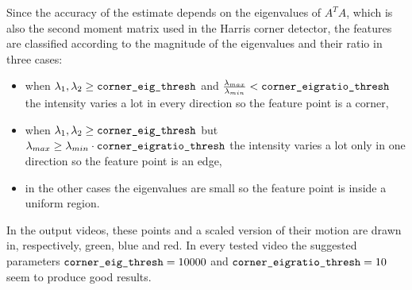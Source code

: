 \documentclass[a4paper,oneside]{article}
\newcommand{\textinlinecode}[1]{\lstinline[basicstyle=\ttfamily,keywordstyle={},stringstyle={},commentstyle={\itshape}]{#1}}
\newcommand{\inlinecode}[1]{\ifmmode\text{\textinlinecode{#1}}\else\textinlinecode{#1}\fi}
\begin{document}
Since the accuracy of the estimate depends on the eigenvalues of
$A^TA$, which is also the second moment matrix used in the Harris
corner detector, the features are classified according to the
magnitude of the eigenvalues and their ratio in three cases:
\begin{itemize}
  \item when $\lambda_1, \lambda_2 \geq
    \inlinecode{corner_eig_thresh}$ and
    $\frac{\lambda_{max}}{\lambda_{min}} <
    \inlinecode{corner_eigratio_thresh}$ the intensity varies a lot in
    every direction so the feature point is a corner,
    \item when $\lambda_1, \lambda_2 \geq
      \inlinecode{corner_eig_thresh}$ but $\lambda_{max} \geq
      \lambda_{min} \cdot \inlinecode{corner_eigratio_thresh}$ the
      intensity varies a lot only in one direction so the feature
      point is an edge,
    \item in the other cases the eigenvalues are small so the feature
      point is inside a uniform region.
\end{itemize}
In the output videos, these points and a scaled version of their
motion are drawn in, respectively, green, blue and red. In every
tested video the suggested parameters $ \inlinecode{corner_eig_thresh}
= 10000$ and $ \inlinecode{corner_eigratio_thresh} = 10$ seem to
produce good results.
\end{document}
